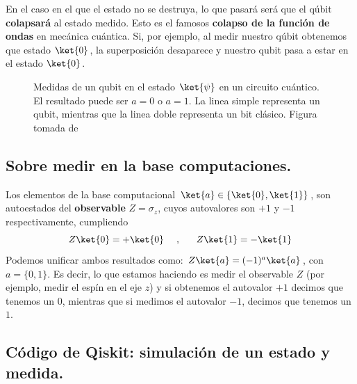\documentclass[a4paper,11pt]{book} %
\numberwithin{equation}{chapter}
\begin{document}
En el caso en el que el estado no se destruya, lo que pasará será que el qúbit \textbf{colapsará} al estado medido. Esto es el famosos \textbf{colapso de la función de ondas} en mecánica cuántica. Si, por ejemplo, al medir nuestro qúbit obtenemos que estado $\ket{0}$, la superposición desaparece y nuestro qubit pasa a estar en el estado $\ket{0}$.

\begin{figure}[H] \setcounter{subfigure}{0} 
\centering
{}  \hspace{2cm}
\caption{Medidas de un qubit en el estado $\ket{\psi}$ en un circuito cuántico. El resultado puede ser $a = 0$ o $a=1$. La linea simple representa un qubit, mientras que la linea doble representa un bit clásico. Figura tomada de \cite{Curso-JMas}}
\label{Fig_medidas1_cubit_meter}
\end{figure}

		\subsection{Sobre medir en la base computaciones.}

Los elementos de la base computacional $\ket{a}\in \{\ket{0},\ket{1}\}$, son autoestados del \textbf{observable} $Z = \sigma_z $, cuyos autovalores son $+1$ y $-1$ respectivamente, cumpliendo
$$
Z\ket{0} = +\ket{0}~~~~,~~~~~ Z\ket{1} = -\ket{1}
$$ 
Podemos unificar ambos resultados como: $Z\ket{a} = (-1)^a\ket{a}$, con  $a=\{0,1\}$. Es decir, lo que estamos haciendo es medir el observable $Z$ (por ejemplo, medir el espín en el eje $z$) y si obtenemos el autovalor $+1$ decimos que tenemos un 0, mientras que si medimos el autovalor $-1$, decimos que tenemos un $1$. 


		\subsection{Código de Qiskit: simulación de un estado y medida.}  \label{sec_medidas_subsub_codigo}
\end{document}
